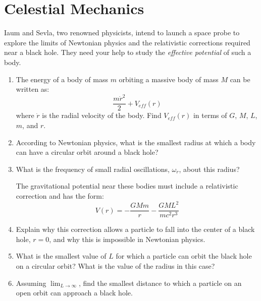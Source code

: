 \documentclass[11pt]{article}
\begin{document}
\section{Celestial Mechanics}
\begin{pproblem}
    Iaum and Sevla, two renowned physicists, intend to launch a space probe to explore the limits of Newtonian physics and the relativistic corrections required near a black hole. They need your help to study the \textit{effective potential} of such a body.
    \begin{enumerate}[label=\textbf{\alph*)}]
        \item The energy of a body of mass \(m\) orbiting a massive body of mass \(M\) can be written as:
             \[
             \frac{m\dot r ^2}{2} + V_{eff}(r)
             \]
             where \(\dot r\) is the radial velocity of the body. Find \(V_{eff}(r)\) in terms of \(G\), \(M\), \(L\), \(m\), and \(r\).

        \item According to Newtonian physics, what is the smallest radius at which a body can have a circular orbit around a black hole?
    
        \item What is the frequency of small radial oscillations, \(\omega_r\), about this radius?

        The gravitational potential near these bodies must include a relativistic correction and has the form:
        \[
        V(r) = -\frac{GMm}{r} - \frac{GML^2}{mc^2r^3}
        \]

        \item Explain why this correction allows a particle to fall into the center of a black hole, \(r=0\), and why this is impossible in Newtonian physics.
        
        \item What is the smallest value of \(L\) for which a particle can orbit the black hole on a circular orbit? What is the value of the radius in this case?
        
        \item Assuming \( \lim_{L \to \infty}\), find the smallest distance to which a particle on an open orbit can approach a black hole.  
    \end{enumerate}
    
\end{pproblem}
\end{document}
